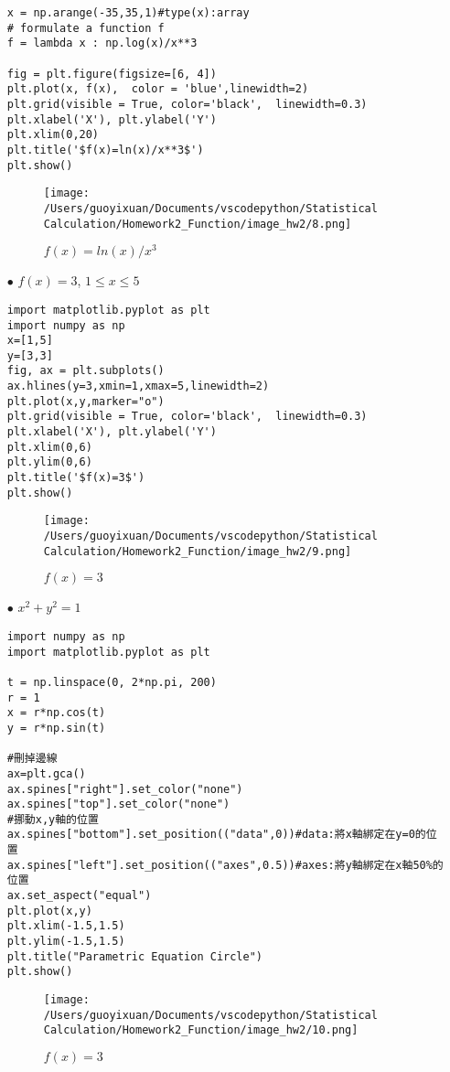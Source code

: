 \begin{itemize}
\begin{lstlisting}
x = np.arange(-35,35,1)#type(x):array
# formulate a function f
f = lambda x : np.log(x)/x**3
 
fig = plt.figure(figsize=[6, 4])
plt.plot(x, f(x),  color = 'blue',linewidth=2)
plt.grid(visible = True, color='black',  linewidth=0.3)
plt.xlabel('X'), plt.ylabel('Y')
plt.xlim(0,20)
plt.title('$f(x)=ln(x)/x**3$')
plt.show()
\end{lstlisting}

\begin{figure}[H]
    \centering
        \texttt{[image: /Users/guoyixuan/Documents/vscodepython/Statistical Calculation/Homework2\_Function/image\_hw2/8.png]}
    \caption{$f(x)=ln(x)/x^3$}
    \label{fig:f(x)=ln(x)/x^3}
\end{figure}

\item[$\bullet$] $f(x)=3$, $1 \leq x \leq 5$
\bigskip
\begin{lstlisting}
import matplotlib.pyplot as plt
import numpy as np
x=[1,5]
y=[3,3]
fig, ax = plt.subplots()
ax.hlines(y=3,xmin=1,xmax=5,linewidth=2)
plt.plot(x,y,marker="o")
plt.grid(visible = True, color='black',  linewidth=0.3)
plt.xlabel('X'), plt.ylabel('Y')
plt.xlim(0,6)
plt.ylim(0,6)
plt.title('$f(x)=3$')
plt.show()
\end{lstlisting}

\begin{figure}[H]
    \centering
        \texttt{[image: /Users/guoyixuan/Documents/vscodepython/Statistical Calculation/Homework2\_Function/image\_hw2/9.png]}
    \caption{$f(x)=3$}
    \label{fig:f(x)=3}
\end{figure}

\item[$\bullet$] $x^2+y^2=1$
\bigskip
\begin{lstlisting}
import numpy as np
import matplotlib.pyplot as plt

t = np.linspace(0, 2*np.pi, 200)
r = 1
x = r*np.cos(t)
y = r*np.sin(t)

#刪掉邊線
ax=plt.gca()
ax.spines["right"].set_color("none")
ax.spines["top"].set_color("none")
#挪動x,y軸的位置
ax.spines["bottom"].set_position(("data",0))#data:將x軸綁定在y=0的位置
ax.spines["left"].set_position(("axes",0.5))#axes:將y軸綁定在x軸50%的位置
ax.set_aspect("equal")
plt.plot(x,y)
plt.xlim(-1.5,1.5)
plt.ylim(-1.5,1.5)
plt.title("Parametric Equation Circle")
plt.show()
\end{lstlisting}

\begin{figure}[H]
    \centering
        \texttt{[image: /Users/guoyixuan/Documents/vscodepython/Statistical Calculation/Homework2\_Function/image\_hw2/10.png]}
    \caption{$f(x)=3$}
    \label{fig:circle}
\end{figure}


\end{itemize}
